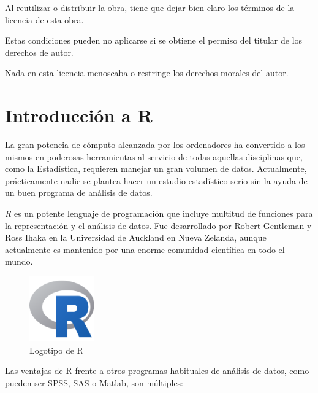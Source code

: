 \documentclass[
  a4paper,
]{scrreport}
\begin{document}
Al reutilizar o distribuir la obra, tiene que dejar bien claro los
términos de la licencia de esta obra.

Estas condiciones pueden no aplicarse si se obtiene el permiso del
titular de los derechos de autor.

Nada en esta licencia menoscaba o restringe los derechos morales del
autor.


\hypertarget{introducciuxf3n-a-r}{%
\chapter{Introducción a R}\label{introducciuxf3n-a-r}}

La gran potencia de cómputo alcanzada por los ordenadores ha convertido
a los mismos en poderosas herramientas al servicio de todas aquellas
disciplinas que, como la Estadística, requieren manejar un gran volumen
de datos. Actualmente, prácticamente nadie se plantea hacer un estudio
estadístico serio sin la ayuda de un buen programa de análisis de datos.

\emph{R} es un potente lenguaje de programación que incluye multitud de
funciones para la representación y el análisis de datos. Fue
desarrollado por Robert Gentleman y Ross Ihaka en la Universidad de
Auckland en Nueva Zelanda, aunque actualmente es mantenido por una
enorme comunidad científica en todo el mundo.

\begin{figure}

{\centering \includegraphics[width=0.25\textwidth,height=\textheight]{./img/logos/Rlogo.png}

}

\caption{Logotipo de R}

\end{figure}

Las ventajas de R frente a otros programas habituales de análisis de
datos, como pueden ser SPSS, SAS o Matlab, son múltiples:
\end{document}
